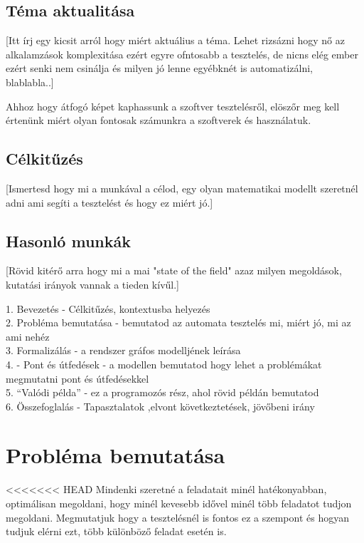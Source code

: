 \documentclass[12pt]{article}
\begin{document}
\subsection{Téma aktualitása}
[Itt írj egy kicsit arról hogy miért aktuálius a téma. Lehet rizsázni hogy nő az alkalamzások komplexitása ezért egyre ofntosabb a tesztelés, de nicns elég ember ezért senki nem csinálja és milyen jó lenne egyébknét is automatizálni, blablabla..]

Ahhoz hogy átfogó képet kaphassunk a szoftver tesztelésről, elöszőr meg kell értenünk miért olyan fontosak számunkra a szoftverek és használatuk. 



\subsection{Célkitűzés}
[Ismertesd hogy mi a munkával a célod,  egy olyan matematikai modellt szeretnél adni ami segíti a tesztelést és hogy ez miért jó.]

\subsection{Hasonló munkák}
[Rövid kitérő arra hogy mi a mai "state of the field" azaz milyen megoldások, kutatási irányok vannak a tieden kívűl.]

1. Bevezetés - Célkitűzés, kontextusba helyezés\\
2. Probléma bemutatása - bemutatod az automata tesztelés mi, miért jó, mi az ami nehéz\\
3. Formalizálás - a rendszer gráfos modelljének leírása\\
4. - Pont és útfedések - a modellen bemutatod hogy lehet a problémákat megmutatni pont és útfedésekkel\\
5. “Valódi példa” - ez a programozós rész, ahol rövid példán bemutatod\\
6. Összefoglalás - Tapasztalatok ,elvont következtetések, jövőbeni irány\\

\section{Probléma bemutatása}

<<<<<<< HEAD
Mindenki szeretné a feladatait minél hatékonyabban, optimálisan megoldani, hogy minél kevesebb idővel minél több feladatot tudjon megoldani. Megmutatjuk hogy a tesztelésnél is fontos ez a szempont és hogyan tudjuk elérni ezt, több különböző feladat esetén is.
\end{document}
